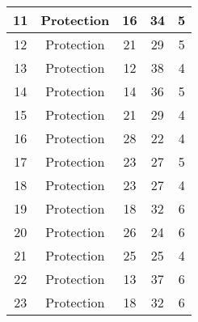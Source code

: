 \documentclass[results.tex]{subfiles}
\begin{document}
\begin{center}
\begin{tabular}{| c || c | c | c | c |}
            \hline
            11                      & Protection                   & 16                     & 34                      & 5                    \\
            \hline
            12                      & Protection                   & 21                     & 29                      & 5                    \\
            \hline
            13                      & Protection                   & 12                     & 38                      & 4                    \\
            \hline
            14                      & Protection                   & 14                     & 36                      & 5                    \\
            \hline
            15                      & Protection                   & 21                     & 29                      & 4                    \\
            \hline
            16                      & Protection                   & 28                     & 22                      & 4                    \\
            \hline
            17                      & Protection                   & 23                     & 27                      & 5                    \\
            \hline
            18                      & Protection                   & 23                     & 27                      & 4                    \\
            \hline
            19                      & Protection                   & 18                     & 32                      & 6                    \\
            \hline
            20                      & Protection                   & 26                     & 24                      & 6                    \\
            \hline
            21                      & Protection                   & 25                     & 25                      & 4                    \\
            \hline
            22                      & Protection                   & 13                     & 37                      & 6                    \\
            \hline
            23                      & Protection                   & 18                     & 32                      & 6                    \\

\end{tabular}
\end{center}
\end{document}
